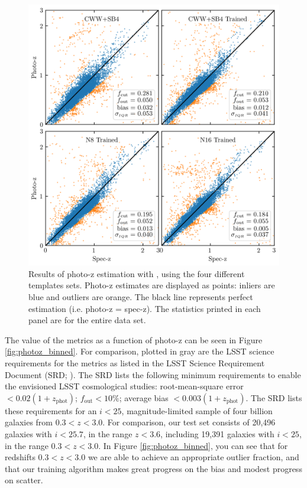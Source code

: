 \begin{figure}
    \centering
    \includegraphics{photoz_results.png}
    \caption{Results of photo-z estimation with \bpz, using the four different templates sets. Photo-z estimates are displayed as points: inliers are blue and outliers are orange. The black line represents perfect estimation (i.e. photo-z = spec-z). The statistics printed in each panel are for the entire data set.}
    \label{fig:photoz_results}
\end{figure}

The value of the metrics as a function of photo-z can be seen in Figure \ref{fig:photoz_binned}. For comparison, plotted in gray are the LSST science requirements for the metrics as listed in the LSST Science Requirement Document (SRD; \citealt{Ivezic2018}).
The SRD lists the following minimum requirements to enable the envisioned LSST cosmological studies: root-mean-square error $< 0.02(1+z_\text{phot})$; $f_\text{out} < 10\%$; average bias $<0.003(1+z_\text{phot})$.
The SRD lists these requirements for an $i<25$, magnitude-limited sample of four billion galaxies from $0.3 < z < 3.0$.
For comparison, our test set consists of 20,496 galaxies with $i < 25.7$, in the range $z < 3.6$, including 19,391 galaxies with $i < 25$, in the range $0.3 < z < 3.0$.
In Figure \ref{fig:photoz_binned}, you can see that for redshifts $0.3 < z < 3.0$ we are able to achieve an appropriate outlier fraction, and that our training algorithm makes great progress on the bias and modest progress on scatter.


